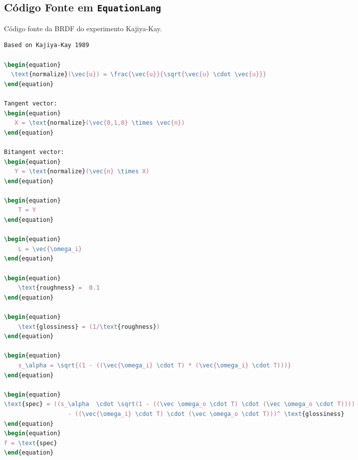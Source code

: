 \subsection{Código Fonte em \texttt{EquationLang}}
\begin{codigo}[H]
    \caption{\small Código fonte da BRDF do experimento Kajiya-Kay.}
    \label{cod-kajiya-eqlang}
\begin{lstlisting}[language=tex, frame=none, inputencoding=utf8]
Based on Kajiya-Kay 1989

\begin{equation}
  \text{normalize}(\vec{u}) = \frac{\vec{u}}{\sqrt{\vec{u} \cdot \vec{u}}}
\end{equation}

Tangent vector:
\begin{equation}
   X = \text{normalize}(\vec{0,1,0} \times \vec{n})
\end{equation}

Bitangent vector:
\begin{equation}
   Y = \text{normalize}(\vec{n} \times X)
\end{equation}

\begin{equation}
    T = Y
\end{equation}

\begin{equation}
    L = \vec{\omega_i}
\end{equation}

\begin{equation}
    \text{roughness} =  0.1
\end{equation}

\begin{equation}
    \text{glossiness} = (1/\text{roughness})
\end{equation}

\begin{equation}
    s_\alpha = \sqrt{(1 - ((\vec{\omega_i} \cdot T) * (\vec{\omega_i} \cdot T)))}
\end{equation}

\begin{equation}
\text{spec} = ((s_\alpha  \cdot \sqrt(1 - ((\vec \omega_o \cdot T) \cdot (\vec \omega_o \cdot T))))
                  - ((\vec{\omega_i} \cdot T) \cdot (\vec \omega_o \cdot T)))^ \text{glossiness}
\end{equation}
\begin{equation}
f = \text{spec}
\end{equation}
\end{lstlisting}
\end{codigo}
